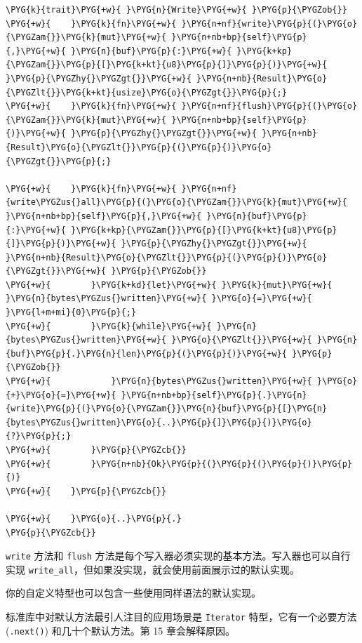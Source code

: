 \begin{Verbatim}[commandchars=\\\{\},breaklines=true,breakanywhere=true,fontsize=\codefont,xleftmargin=17bp]
\PYG{k}{trait}\PYG{+w}{ }\PYG{n}{Write}\PYG{+w}{ }\PYG{p}{\PYGZob{}}
\PYG{+w}{    }\PYG{k}{fn}\PYG{+w}{ }\PYG{n+nf}{write}\PYG{p}{(}\PYG{o}{\PYGZam{}}\PYG{k}{mut}\PYG{+w}{ }\PYG{n+nb+bp}{self}\PYG{p}{,}\PYG{+w}{ }\PYG{n}{buf}\PYG{p}{:}\PYG{+w}{ }\PYG{k+kp}{\PYGZam{}}\PYG{p}{[}\PYG{k+kt}{u8}\PYG{p}{]}\PYG{p}{)}\PYG{+w}{ }\PYG{p}{\PYGZhy{}\PYGZgt{}}\PYG{+w}{ }\PYG{n+nb}{Result}\PYG{o}{\PYGZlt{}}\PYG{k+kt}{usize}\PYG{o}{\PYGZgt{}}\PYG{p}{;}
\PYG{+w}{    }\PYG{k}{fn}\PYG{+w}{ }\PYG{n+nf}{flush}\PYG{p}{(}\PYG{o}{\PYGZam{}}\PYG{k}{mut}\PYG{+w}{ }\PYG{n+nb+bp}{self}\PYG{p}{)}\PYG{+w}{ }\PYG{p}{\PYGZhy{}\PYGZgt{}}\PYG{+w}{ }\PYG{n+nb}{Result}\PYG{o}{\PYGZlt{}}\PYG{p}{(}\PYG{p}{)}\PYG{o}{\PYGZgt{}}\PYG{p}{;}

\PYG{+w}{    }\PYG{k}{fn}\PYG{+w}{ }\PYG{n+nf}{write\PYGZus{}all}\PYG{p}{(}\PYG{o}{\PYGZam{}}\PYG{k}{mut}\PYG{+w}{ }\PYG{n+nb+bp}{self}\PYG{p}{,}\PYG{+w}{ }\PYG{n}{buf}\PYG{p}{:}\PYG{+w}{ }\PYG{k+kp}{\PYGZam{}}\PYG{p}{[}\PYG{k+kt}{u8}\PYG{p}{]}\PYG{p}{)}\PYG{+w}{ }\PYG{p}{\PYGZhy{}\PYGZgt{}}\PYG{+w}{ }\PYG{n+nb}{Result}\PYG{o}{\PYGZlt{}}\PYG{p}{(}\PYG{p}{)}\PYG{o}{\PYGZgt{}}\PYG{+w}{ }\PYG{p}{\PYGZob{}}
\PYG{+w}{        }\PYG{k+kd}{let}\PYG{+w}{ }\PYG{k}{mut}\PYG{+w}{ }\PYG{n}{bytes\PYGZus{}written}\PYG{+w}{ }\PYG{o}{=}\PYG{+w}{ }\PYG{l+m+mi}{0}\PYG{p}{;}
\PYG{+w}{        }\PYG{k}{while}\PYG{+w}{ }\PYG{n}{bytes\PYGZus{}written}\PYG{+w}{ }\PYG{o}{\PYGZlt{}}\PYG{+w}{ }\PYG{n}{buf}\PYG{p}{.}\PYG{n}{len}\PYG{p}{(}\PYG{p}{)}\PYG{+w}{ }\PYG{p}{\PYGZob{}}
\PYG{+w}{            }\PYG{n}{bytes\PYGZus{}written}\PYG{+w}{ }\PYG{o}{+}\PYG{o}{=}\PYG{+w}{ }\PYG{n+nb+bp}{self}\PYG{p}{.}\PYG{n}{write}\PYG{p}{(}\PYG{o}{\PYGZam{}}\PYG{n}{buf}\PYG{p}{[}\PYG{n}{bytes\PYGZus{}written}\PYG{o}{..}\PYG{p}{]}\PYG{p}{)}\PYG{o}{?}\PYG{p}{;}
\PYG{+w}{        }\PYG{p}{\PYGZcb{}}
\PYG{+w}{        }\PYG{n+nb}{Ok}\PYG{p}{(}\PYG{p}{(}\PYG{p}{)}\PYG{p}{)}
\PYG{+w}{    }\PYG{p}{\PYGZcb{}}

\PYG{+w}{    }\PYG{o}{..}\PYG{p}{.}
\PYG{p}{\PYGZcb{}}
\end{Verbatim}

\texttt{write} 方法和 \texttt{flush} 方法是每个写入器必须实现的基本方法。写入器也可以自行实现 \texttt{write\_all}，但如果没实现，就会使用前面展示过的默认实现。

你的自定义特型也可以包含一些使用同样语法的默认实现。

标准库中对默认方法最引人注目的应用场景是 \texttt{Iterator} 特型，它有一个必要方法 (\texttt{.next()}) 和几十个默认方法。第 15 章会解释原因。

